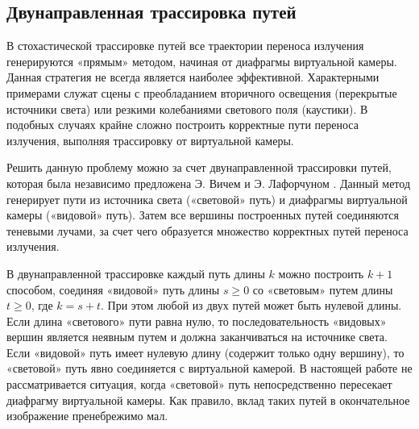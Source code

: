 \subsection{Двунаправленная трассировка путей}

В стохастической трассировке путей все траектории переноса излучения генерируются «прямым» методом, начиная от диафрагмы виртуальной камеры. Данная стратегия не всегда является наиболее эффективной. Характерными примерами служат сцены с преобладанием вторичного освещения (перекрытые источники света) или резкими колебаниями светового поля (каустики). В подобных случаях крайне сложно построить корректные пути переноса излучения, выполняя трассировку от виртуальной камеры.

Решить данную проблему можно за счет двунаправленной трассировки путей, которая была независимо предложена Э. Вичем \cite{veach1997robust} и Э. Лафорчуном \cite{lafortune1993bi}. Данный метод генерирует пути из источника света («световой» путь) и диафрагмы виртуальной камеры («видовой» путь). Затем все вершины построенных путей соединяются теневыми лучами, за счет чего образуется множество корректных путей переноса излучения.

В двунаправленной трассировке каждый путь длины $k$ можно построить $k + 1$ способом, соединяя «видовой» путь длины $s \ge 0$ со «световым» путем длины $t \ge 0$, где $k = s + t$. При этом любой из двух путей может быть нулевой длины. Если длина «светового» пути равна нулю, то последовательность «видовых» вершин является неявным путем и должна заканчиваться на источнике света. Если «видовой» путь имеет нулевую длину (содержит только одну вершину), то «световой» путь явно соединяется с виртуальной камерой. В настоящей работе не рассматривается ситуация, когда «световой» путь непосредственно пересекает диафрагму виртуальной камеры. Как правило, вклад таких путей в окончательное изображение пренебрежимо мал.


